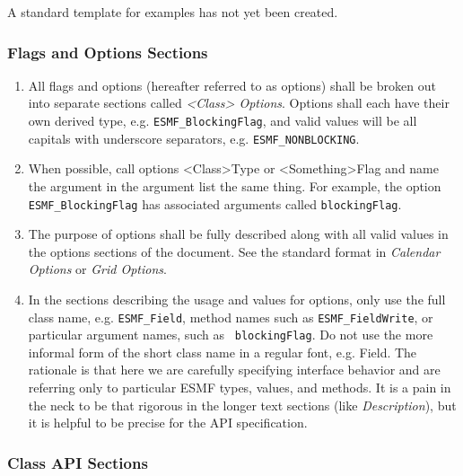 A standard template for examples has not yet been created.

\subsubsection{Flags and Options Sections}

\begin{enumerate}
\item All flags and options (hereafter referred to as options) 
shall be broken out into separate sections called {\it <Class> Options}.  
Options shall each have their own derived type, 
e.g. {\tt ESMF\_BlockingFlag}, and valid values will be all capitals
with underscore separators, e.g. {\tt ESMF\_NONBLOCKING}.

\item When possible, call options <Class>Type or <Something>Flag and
name the argument in the argument list the same thing.  For example,
the option {\tt ESMF\_BlockingFlag} has associated arguments 
called {\tt blockingFlag}.

\item The purpose of options shall be fully described along with all 
valid values in the options sections of the document.  See the
standard format in {\it Calendar Options} or {\it Grid Options}.

\item In the sections describing the usage and values for options, 
only use the full class name, e.g. {\tt ESMF\_Field}, method names such
as {\tt ESMF\_FieldWrite}, or particular argument names, such as {\tt
blockingFlag}. Do not use the more informal form of the short class
name in a regular font, e.g. Field.  The rationale is that here we 
are carefully specifying interface behavior and are referring only 
to particular ESMF types, values, and methods.  It is a pain in 
the neck to be that rigorous in the longer text sections 
(like {\it Description}), but it is helpful to be precise for the 
API specification.
\end{enumerate}

\subsubsection{Class API Sections}

